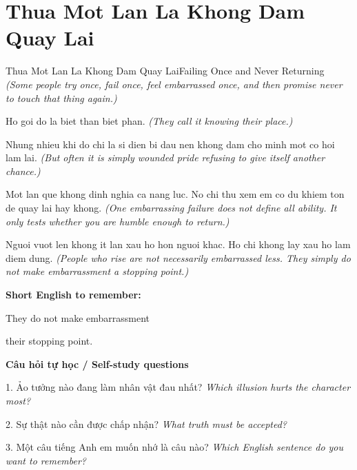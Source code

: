 \section{Thua Mot Lan La Khong Dam Quay Lai}
\begin{truyen}{Thua Mot Lan La Khong Dam Quay Lai}{Failing Once and Never Returning}
\textit{(Some people try once, fail once, feel embarrassed once, and then promise never to touch that thing again.)}

Ho goi do la biet than biet phan.
\textit{(They call it knowing their place.)}

Nhung nhieu khi do chi la si dien bi dau nen khong dam cho minh mot co hoi lam lai.
\textit{(But often it is simply wounded pride refusing to give itself another chance.)}

Mot lan que khong dinh nghia ca nang luc. No chi thu xem em co du khiem ton de quay lai hay khong.
\textit{(One embarrassing failure does not define all ability. It only tests whether you are humble enough to return.)}

\end{truyen}

\begin{baihoc}
Nguoi vuot len khong it lan xau ho hon nguoi khac. Ho chi khong lay xau ho lam diem dung.
\textit{(People who rise are not necessarily embarrassed less. They simply do not make embarrassment a stopping point.)}
\end{baihoc}

\begin{ghinhoanh}
\textbf{Short English to remember:}

They do not make embarrassment

their stopping point.

\end{ghinhoanh}

\begin{tuhocnhanh}
\textbf{Câu hỏi tự học / Self-study questions}

1. Ảo tưởng nào đang làm nhân vật đau nhất? \textit{Which illusion hurts the character most?}

2. Sự thật nào cần được chấp nhận? \textit{What truth must be accepted?}

3. Một câu tiếng Anh em muốn nhớ là câu nào? \textit{Which English sentence do you want to remember?}
\end{tuhocnhanh}
\ngancach


